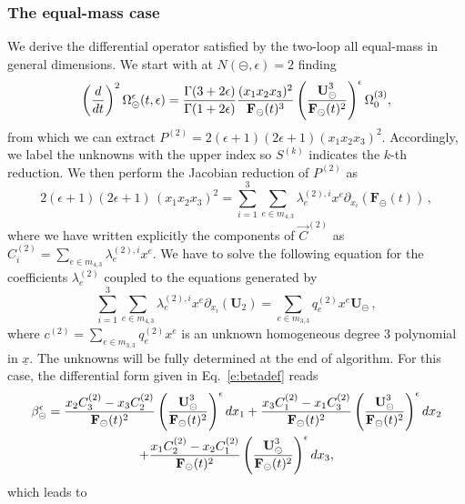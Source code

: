 \documentclass[a4paper,12pt]{article}
\numberwithin{equation}{section}
\numberwithin{figure}{section}
\def\su{\circleddash}
\begin{document}
\subsubsection{The equal-mass case}\label{sec:2sunset1mass}
We derive the differential  operator satisfied by the two-loop all
equal-mass in general dimensions. 
We  start with at $N(\su,\epsilon)=2$ finding
\begin{equation}
 \left(d\over dt\right)^2
 \Omega_{\su}^{\epsilon}(t,\epsilon)={\Gamma(3+2\epsilon)\over\Gamma(1+2\epsilon)} {(x_1x_2x_3)^2\over \textbf{F}_\su(t)^3}
 \left(\textbf{U}_\su^3\over \textbf{F}_\su(t)^2\right)^\epsilon  \Omega_0^{(3)} ,
\end{equation}
from which we can extract $P^{(2)}=2 (\epsilon +1) (2 \epsilon +1)(x_1x_2x_3)^2$. 
%
Accordingly, we label the unknowns with the upper index so $S^{(k)}$ indicates the $k$-th reduction. We then  perform the Jacobian reduction of $P^{(2)}$ as
\begin{equation}\label{e:reduc}
  2 (\epsilon +1) (2 \epsilon +1)\,  (x_1x_2x_3)^2= \sum_{i=1}^3 
  \sum_{e\in m_{4,3}}\lambda^{(2),i}_{e} x^e \partial_{x_i}  (\textbf{F}_\su(t)) \,,
\end{equation}
%
where we have written explicitly the components of $\vec{C}^{(2)}$ as $C^{(2)}_i=\sum_{e\in m_{4,3}}\lambda^{(2),i}_{e} x^e$.
We have to solve the following equation for the coefficients $\lambda_e^{(2)}$ coupled to the equations generated by
\begin{equation}\label{e:C2red}
\sum_{i=1}^3 
\sum_{e\in m_{4,3}}\lambda^{(2),i}_{e} x^e \partial_{x_i}(\mathbf U_2) = \sum_{e\in m_{3,3}} q^{(2)}_e x^e \textbf{U}_\su \,, 
%
\end{equation}
where $c^{(2)}=\sum_{e\in m_{3,3}} q^{(2)}_e x^e$ is an unknown homogeneous degree 3 polynomial
in $\underline x$.
%
The unknowns will be fully determined at the end of  algorithm. For this case, 
the differential form given in Eq.~\eqref{e:betadef} reads
%
 \begin{multline}
 	\label{eq:beta-equalmass-sunset}
   \beta_\su^\epsilon=   {x_2  C_3^{(2)}-x_3  C_2^{(2)}\over
     \textbf{F}_\su(t)^2} \left(\textbf{U}_\su^3\over \textbf{F}_\su(t)^2\right)^\epsilon dx_1+   {x_3  C_1^{(2)}-x_1 C_3^{(2)}\over
     \textbf{F}_\su(t)^2} \left(\textbf{U}_\su^3\over \textbf{F}_\su(t)^2\right)^\epsilon dx_2\cr
   +  {x_1  C_2^{(2)}-x_2  C_1^{(2)}\over
    \textbf{F}_\su(t)^2} \left(\textbf{U}_\su^3\over \textbf{F}_\su(t)^2\right)^\epsilon dx_3, 
 \end{multline}
which leads to 
\end{document}
